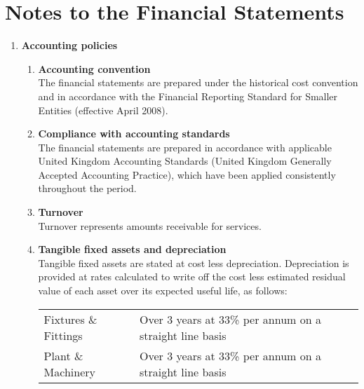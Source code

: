 \section {Notes to the Financial Statements}
\begin{enumerate}
    \item {\bf Accounting policies}
    \begin{enumerate}
        \item {\bf Accounting convention} \\
                The financial statements are prepared under the 
            historical cost convention and in accordance with the Financial Reporting 
            Standard for Smaller Entities (effective April 2008).
        \item {\bf Compliance with accounting standards} \\
            The financial statements are prepared in accordance with applicable United
            Kingdom Accounting Standards (United Kingdom Generally Accepted Accounting
            Practice), which have been applied consistently throughout the period.
        \item {\bf Turnover} \\
            Turnover represents amounts receivable for services.
        \item {\bf Tangible fixed assets and depreciation} \\
            Tangible fixed assets are stated at cost less depreciation. Depreciation is
            provided at rates calculated to write off the cost less estimated residual
            value of each asset over its expected useful life, as follows: \\
            \begin{tabular}{  l  p{6.5cm} }
                \toprule
                Fixtures \& Fittings & Over 3 years at 33\% per annum on a straight line basis \\
                Plant \& Machinery & Over 3 years at 33\% per annum on a straight line basis \\
                \bottomrule
            \end{tabular}
    \end{enumerate}
\end{enumerate}
